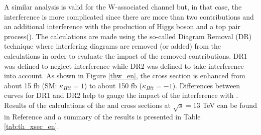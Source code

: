 A similar analysis is valid for the W-associated channel but, in that case, the interference is more complicated since there are more than two contributions and an additional interference with the production of Higgs boson and a top pair process(\ttH). The calculations are made using the so-called Diagram Removal (DR) technique where interfering diagrams are removed (or added) from the calculations in order to evaluate the impact of the removed contributions. DR1 was defined to neglect \ttH interference while DR2 was defined to take \ttH interference into account\cite{demartin}. As shown in Figure \ref{thw_en}, the \tHW cross section is enhanced from about 15 fb (SM: $\kappa_{Htt}=1$) to about 150 fb ($\kappa_{Htt}=-1$). Differences between curves for DR1 and DR2 help to gauge the impact of the interference with \ttH.\\      
Results of the calculations of the \tHq and \tHW cross sections at $\sqrt{s}=13$ TeV can be found in Reference \cite{yellow} and a summary of the results is presented in Table \ref{tab:th_xsec_en}.
